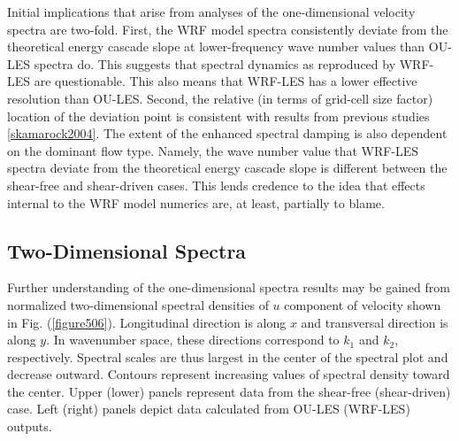 Initial implications that arise from analyses of the one-dimensional velocity spectra are two-fold. First, the WRF model spectra consistently deviate from the theoretical energy cascade slope at lower-frequency wave number values than OU-LES spectra do. This suggests that spectral dynamics as reproduced by WRF-LES are questionable. This also means that WRF-LES has a lower effective resolution than OU-LES. Second, the relative (in terms of grid-cell size factor) location of the deviation point is consistent with results from previous studies \autoref{skamarock2004}. The extent of the enhanced spectral damping is also dependent on the dominant flow type. Namely, the wave number value that WRF-LES spectra deviate from the theoretical energy cascade slope is different between the shear-free and shear-driven cases. This lends credence to the idea that effects internal to the WRF model numerics are, at least, partially to blame. 

\subsection{Two-Dimensional Spectra}
\label{spectra2d-533}

Further understanding of the one-dimensional spectra results may be gained from normalized two-dimensional spectral densities of $u$ component of velocity shown in Fig. (\autoref{figure506}). Longitudinal direction is along $x$ and transversal direction is along $y$. In wavenumber space, these directions correspond to $k_1$ and $k_2$, respectively. Spectral scales are thus largest in the center of the spectral plot and decrease outward. Contours represent increasing values of spectral density toward the center. Upper (lower) panels represent data from the shear-free (shear-driven) case. Left (right) panels depict data calculated from OU-LES (WRF-LES) outputs.


